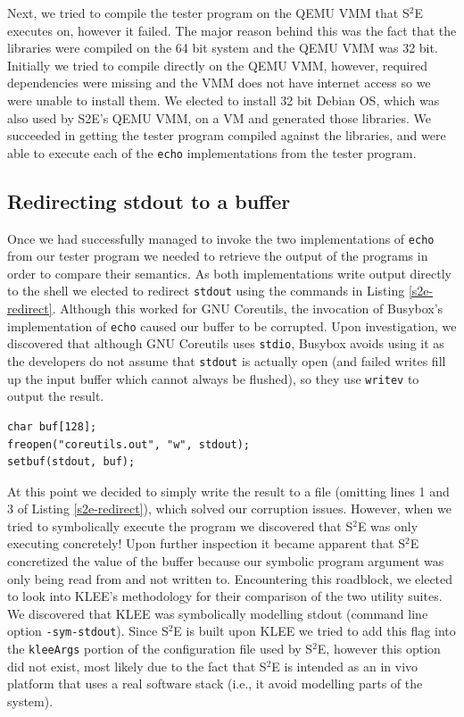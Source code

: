 \documentclass[conference]{IEEEtran}
\begin{document}
Next, we tried to compile the tester program on the QEMU VMM that S$^2$E executes on, however it failed. The major reason behind this was the fact that the libraries were compiled on the 64 bit system and the QEMU VMM was 32 bit. Initially we tried to compile directly on the QEMU VMM, however,  required dependencies were missing and the VMM does not have internet access so we were unable to install them. We elected to install 32 bit Debian OS, which was also used by S2E's QEMU VMM,  on a VM and generated those libraries. We succeeded in getting the tester program compiled against the libraries, and were able to execute each of the {\tt echo} implementations from the tester program.

\subsection{Redirecting stdout to a buffer}

Once we had successfully managed to invoke the two implementations of {\tt echo} from our tester program we needed to retrieve the output of the programs in order to compare their semantics. As both implementations write output directly to the shell we elected to redirect {\tt stdout} using the commands in Listing \ref{s2e-redirect}. Although this worked for GNU Coreutils, the invocation of Busybox's implementation of {\tt echo} caused our buffer to be corrupted. Upon investigation, we discovered that although GNU Coreutils uses {\tt stdio}, Busybox avoids using it as the developers do not assume that {\tt stdout} is actually open (and failed writes fill up the input buffer which cannot always be flushed), so they use {\tt writev} to output the result. \\ 

\begin{lstlisting}[style=C, label=s2e-redirect, abovecaptionskip=2ex, captionpos=b, caption={Code snippet for redirecting stdout to a buffer}]
char buf[128];
freopen("coreutils.out", "w", stdout);
setbuf(stdout, buf);
\end{lstlisting}

At this point we decided to simply write the result to a file (omitting lines 1 and 3 of Listing \ref{s2e-redirect}), which solved our corruption issues. However, when we tried to symbolically execute the program we discovered that S$^2$E was only executing concretely! Upon further inspection it became apparent that S$^2$E concretized the value of the buffer because our symbolic program argument was only being read from and not written to. Encountering this roadblock, we elected to look into KLEE's methodology for their comparison of the two utility suites. We discovered that KLEE was symbolically modelling stdout (command line option {\tt -sym-stdout}). Since S$^2$E is built upon KLEE we tried to add this flag into the {\tt kleeArgs} portion of the configuration file used by S$^2$E, however this option did not exist, most likely due to the fact that S$^2$E is intended as an in vivo platform that uses a real software stack (i.e., it avoid modelling parts of the system).
\end{document}
